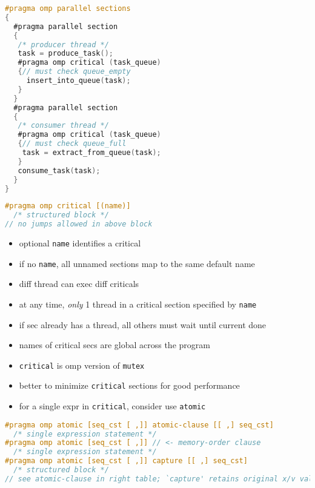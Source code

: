 \begin{minipage}{0.5\linewidth}
\begin{lstlisting}[language=C]
#pragma omp parallel sections
{
  #pragma parallel section
  {
   /* producer thread */
   task = produce_task();
   #pragma omp critical (task_queue)
   {// must check queue_empty
     insert_into_queue(task);
   }
  }
  #pragma parallel section
  {
   /* consumer thread */
   #pragma omp critical (task_queue)
   {// must check queue_full
    task = extract_from_queue(task);
   }
   consume_task(task);
  }
}
\end{lstlisting}
\end{minipage}
\begin{minipage}{0.5\linewidth}
\begin{lstlisting}[language=C,xleftmargin=4pt,framextopmargin=2pt]
#pragma omp critical [(name)]
  /* structured block */
// no jumps allowed in above block
\end{lstlisting}
  \begin{itemize}
  \item optional \texttt{name} identifies a critical
  \item if no \texttt{name}, all unnamed sections map to the same default name
  \item diff thread can exec diff criticals
  \item at any time, \emph{only} 1 thread in a critical section specified by \texttt{name}
  \item if sec already has a thread, all others must wait until current done
  \item names of critical secs are global across the program
  \item \texttt{critical} is omp version of \texttt{mutex}
  \item better to minimize \texttt{critical} sections for good performance
  \item for a single expr in \texttt{critical}, consider use \texttt{atomic}
\end{itemize}
\end{minipage}
\begin{lstlisting}[language=C]
#pragma omp atomic [seq_cst [ ,]] atomic-clause [[ ,] seq_cst]
  /* single expression statement */
#pragma omp atomic [seq_cst [ ,]] // <- memory-order clause
  /* single expression statement */
#pragma omp atomic [seq_cst [ ,]] capture [[ ,] seq_cst]
  /* structured block */
// see atomic-clause in right table; `capture' retains original x/v val
\end{lstlisting}
